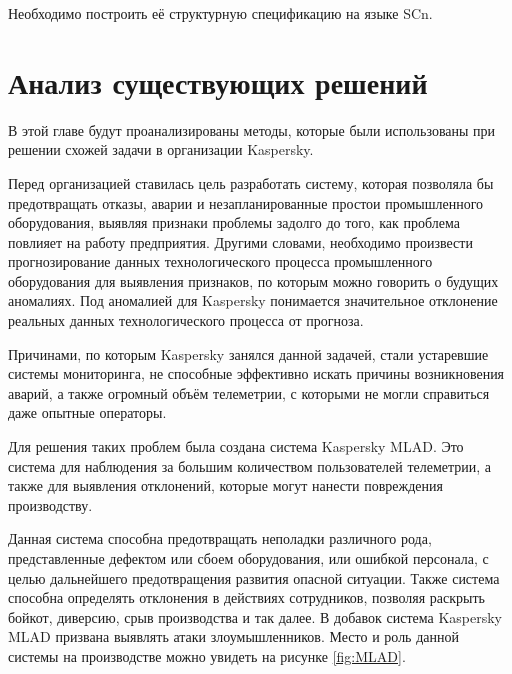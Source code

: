 Необходимо построить её структурную спецификацию на языке SCn.

\section{Анализ существующих решений}

В этой главе будут проанализированы методы, которые были использованы при решении схожей задачи в организации Kaspersky.

Перед организацией ставилась цель разработать систему, которая позволяла бы предотвращать отказы, аварии и незапланированные простои промышленного оборудования, выявляя признаки проблемы задолго до того, как проблема повлияет на работу предприятия. Другими словами, необходимо произвести прогнозирование данных технологического процесса промышленного оборудования для выявления признаков, по которым можно говорить о будущих аномалиях. Под аномалией для Kaspersky понимается значительное отклонение реальных данных технологического процесса от прогноза.

Причинами, по которым Kaspersky занялся данной задачей, стали устаревшие системы мониторинга, не способные эффективно искать причины возникновения аварий, а также огромный объём телеметрии, с которыми не могли справиться даже опытные операторы.

Для решения таких проблем была создана система Kaspersky MLAD. Это система для наблюдения за большим количеством пользователей телеметрии, а также для выявления отклонений, которые могут нанести повреждения производству.

Данная система способна предотвращать неполадки различного рода, представленные дефектом или сбоем оборудования, или ошибкой персонала, с целью дальнейшего предотвращения развития опасной ситуации. Также система способна определять отклонения в действиях сотрудников, позволяя раскрыть бойкот, диверсию, срыв производства и так далее. В добавок система Kaspersky MLAD призвана выявлять атаки злоумышленников. Место и роль данной системы на производстве можно увидеть на рисунке \ref {fig:MLAD}.

